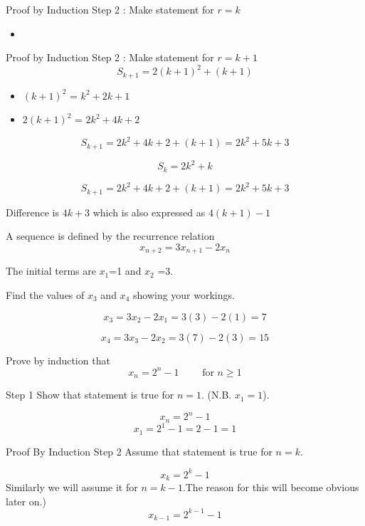 \documentclass[12pt]{article}
\begin{document}

{Proof by Induction}
Step 2  : Make statement for $r=k$
\begin{itemize}
\item 
\end{itemize}


{Proof by Induction}
Step 2  : Make statement for $r=k+1$
\[S_{k+1} = 2(k+1)^2 + (k+1)\]
\begin{itemize}
\item $(k+1)^2$ = $k^2 + 2k + 1$
\item $2(k+1)^2$ = $2k^2 + 4k + 2$
\end{itemize}
\[S_{k+1} = 2k^2 + 4k + 2+ (k+1) = 2k^2 + 5k + 3 \]



\[S_{k} = 2k^2 + k\]

\[S_{k+1} = 2k^2 + 4k + 2+ (k+1) = 2k^2 + 5k + 3 \]

Difference is $4k+3$ which is also expressed as $4(k+1)-1$




A sequence is defined by the recurrence relation
\[ x_{n+2} = 3x_{n+1} - 2x_{n} \]

The initial terms are $x_1$=1 and $x_2$ =3.

Find the values of $x_3$ and $x_4$ showing your workings.

\[ x_{3} = 3x_{2} - 2x_{1} = 3(3) - 2(1) = 7 \]

\[ x_{4} = 3x_{3} - 2x_{2} = 3(7) - 2(3) = 15 \]





Prove by induction that
\[ x_n = 2^n - 1 \qquad \mbox{ for } n \geq 1 \]


Step 1 Show that statement is true for $n=1$.
(N.B. $x_{1} = 1$).

\[ x_n = 2^n - 1 \]
\[ x_1 = 2^1 - 1 = 2 - 1 = 1\]


{Proof By Induction}
Step 2 Assume that statement is true for $n=k$.

\[ x_k = 2^k - 1 \]
Similarly we will assume it for $n=k-1$.The reason for this will become obvious later on.)
\[ x_{k-1} = 2^{k-1} - 1 \]

\end{document}

